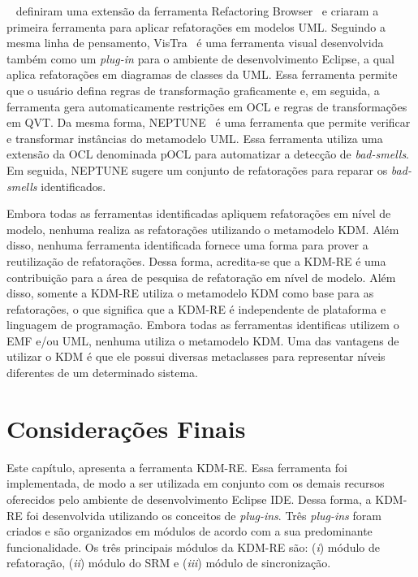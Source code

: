 ~ definiram uma extensão da ferramenta Refactoring Browser~\cite{roberts1997refactoring} e criaram a primeira ferramenta para aplicar refatorações em modelos UML. Seguindo a mesma linha de pensamento,
VisTra~\cite{vstolc2010visual} é uma ferramenta visual desenvolvida também como um \textit{plug-in} para o ambiente de desenvolvimento Eclipse, a qual aplica refatorações em diagramas de classes da UML. Essa ferramenta permite que o usuário defina regras de transformação graficamente e, em seguida, a ferramenta gera automaticamente restrições em OCL e regras de transformações em QVT. Da mesma forma, NEPTUNE~\cite{millan2009ocl} é uma ferramenta que permite verificar e transformar instâncias do metamodelo UML. Essa ferramenta utiliza uma extensão da OCL denominada pOCL para automatizar a detecção de \textit{bad-smells}. Em seguida, NEPTUNE sugere um conjunto de refatorações para reparar os \textit{bad-smells} identificados. 

Embora todas as ferramentas identificadas apliquem refatorações em nível de modelo, nenhuma realiza as refatorações utilizando o metamodelo KDM. Além disso, nenhuma ferramenta identificada fornece uma forma para prover a reutilização de refatorações. Dessa forma, acredita-se que a KDM-RE é uma contribuição para a área de pesquisa de refatoração em nível de modelo. Além disso, somente a KDM-RE utiliza o metamodelo KDM como base para as refatorações, o que significa que a KDM-RE é independente de plataforma e linguagem de programação. Embora todas as ferramentas identificas utilizem o EMF e/ou UML, nenhuma utiliza o metamodelo KDM. Uma das vantagens de utilizar o KDM é que ele possui diversas metaclasses para representar níveis diferentes de um determinado sistema.

\section{Considerações Finais}\label{sec:consideracoes_final_kdm_re}

Este capítulo, apresenta a ferramenta KDM-RE. Essa ferramenta foi implementada, de modo a ser utilizada em conjunto com os demais recursos oferecidos pelo ambiente de desenvolvimento Eclipse IDE. Dessa forma, a KDM-RE foi desenvolvida utilizando os conceitos de \textit{plug-ins}. Três \textit{plug-ins} foram criados e são organizados em módulos de acordo com a sua predominante funcionalidade. Os três principais módulos da KDM-RE são: (\textit{i}) módulo de refatoração, (\textit{ii}) módulo do SRM e (\textit{iii}) módulo de sincronização. 

